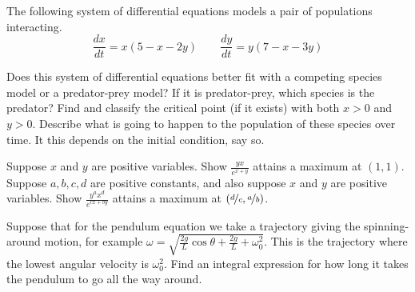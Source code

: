 \documentclass{ximera}
\begin{document}
\begin{exercise}
    The following system of differential equations models a pair of populations interacting. 
    \[ 
        \frac{dx}{dt} = x(5 - x - 2y)\qquad \frac{dy}{dt} = y(7 - x - 3y) 
    \]
    \begin{tasks}
        \task Does this system of differential equations better fit with a competing species model or a predator-prey model? If it is predator-prey, which species is the predator?
        \task Find and classify the critical point (if it exists) with both $x>0$ and $y>0$.
        \task Describe what is going to happen to the population of these species over time. It this depends on the initial condition, say so.
    \end{tasks}
\end{exercise}

\begin{exercise}
    \begin{tasks}
        \task Suppose $x$ and $y$ are positive variables.  Show $\frac{y x}{e^{x+y}}$ attains a maximum at $(1,1)$.
        \task Suppose $a,b,c,d$ are positive constants, and also suppose $x$ and $y$ are positive variables.  Show $\frac{y^a x^d}{e^{cx+by}}$ attains a maximum at $(\nicefrac{d}{c},\nicefrac{a}{b})$.
    \end{tasks}
\end{exercise}

\begin{exercise}
    Suppose that for the pendulum equation we take a trajectory giving the spinning-around motion, for example $\omega = \sqrt{\frac{2g}{L} \cos \theta + \frac{2g}{L} + \omega_0^2}$.  This is the trajectory where the lowest angular velocity is $\omega_0^2$.  Find an integral expression for how long it takes the pendulum to go all the way around.
\end{exercise}

\end{document}
